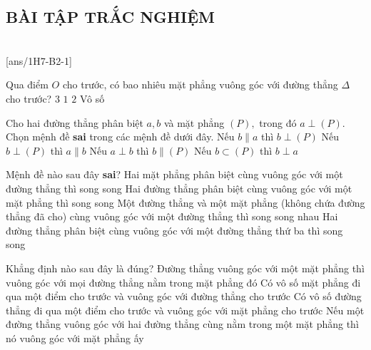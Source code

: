 \subsection{BÀI TẬP TRẮC NGHIỆM}
 \\
\setcounter{ex}{0}
[ans/1H7-B2-1]
\begin{ex}
	Qua điểm $O$ cho trước, có bao nhiêu mặt phẳng vuông góc với đường thẳng $\Delta$ cho trước?
	\choice
	{$3$}
	{\True $1$}
	{$2$}
	{Vô số}
\end{ex}

\begin{ex}
	Cho hai đường thẳng phân biệt $a, b$ và mặt phẳng $(P),$ trong đó $a\perp (P).$ Chọn mệnh đề \textbf{sai} trong các mệnh đề dưới đây.
	\choice
	{Nếu $b\parallel a$ thì $b\perp (P)$}
	{Nếu $b\perp (P)$ thì $a\parallel b$}
	{\True Nếu $a\perp b$ thì $b\parallel (P)$}
	{Nếu $b\subset (P)$ thì $b\perp a$}
\end{ex}

\begin{ex}
	Mệnh đề nào sau đây \textbf{sai}?
	\choice
	{Hai mặt phẳng phân biệt cùng vuông góc với một đường thẳng thì song song}
	{Hai đường thẳng phân biệt cùng vuông góc với một mặt phẳng thì song song}
	{Một đường thẳng và một mặt phẳng (không chứa đường thẳng đã cho) cùng vuông góc với một đường thẳng thì song song nhau}
	{\True Hai đường thẳng phân biệt cùng vuông góc với một đường thẳng thứ ba thì song song}
\end{ex}

\begin{ex}
	Khẳng định nào sau đây là đúng?
	\choice
	{\True Đường thẳng vuông góc với một mặt phẳng thì vuông góc với mọi đường thẳng nằm trong mặt phẳng đó}
	{Có vô số mặt phẳng đi qua một điểm cho trước và vuông góc với đường thẳng cho trước}
	{Có vô số đường thẳng đi qua một điểm cho trước và vuông góc với mặt phẳng cho trước}
	{Nếu một đường thẳng vuông góc với hai đường thẳng cùng nằm trong một mặt phẳng thì nó vuông góc với mặt phẳng ấy}
\end{ex}

